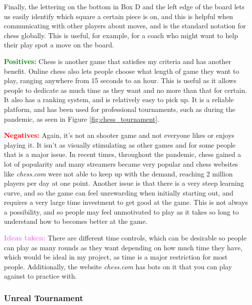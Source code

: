 \vs
Finally, the lettering on the bottom in Box D and the left edge of the board lets us easily identify which square a certain piece is on, and this is helpful when communicating with other players about moves, and is the standard notation for chess globally. This is useful, for example, for a coach who might want to help their play spot a move on the board.
\vs


\textcolor{green}{\textbf{Positives:}}
Chess is another game that satisfies my criteria and has another benefit. Online chess also lets people choose what length of game they want to play, ranging anywhere from 15 seconds to an hour. This is useful as it allows people to dedicate as much time as they want and no more than that for certain. It also has a ranking system, and is relatively easy to pick up. It is a reliable platform, and has been used for professional tournaments, such as during the pandemic, as seen in Figure \ref{fig:chess_tournament}. 
\vs


\textcolor{red}{\textbf{Negatives:}} Again, it's not an shooter game and not everyone likes or enjoys playing it. It isn't as visually stimulating as other games and for some people that is a major issue. In recent times, throughout the pandemic, chess gained a lot of popularity and many streamers became very popular and chess websites like \emph{chess.com} were not able to keep up with the demand, reaching 2 million players per day at one point. Another issue is that there is a very steep learning curve, and so the game can feel unrewarding when initially starting out, and requires a very large time investment to get good at the game. This is not always a possibility, and so people may feel unmotivated to play as it takes so long to understand how to becomes better at the game.
\vs


\textcolor{violet}{\textbf{Ideas taken:}} There are different time controls, which can be desirable so people can play as many rounds as they want depending on how much time they have, which would be ideal in my project, as time is a major restriction for most people. Additionally, the website \emph{chess.com} has bots on it that you can play against to practice with.
\vs

\subsubsection{Unreal Tournament}


